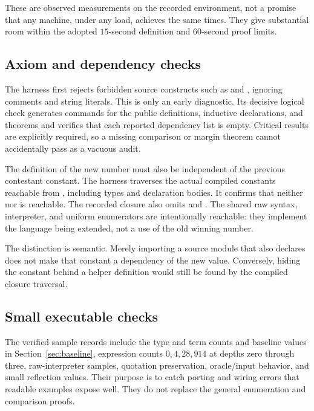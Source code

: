 

These are observed measurements on the recorded environment,
not a promise that any machine, under any load, achieves the same
times. They give substantial room within the adopted \(15\)-second
definition and \(60\)-second proof limits.

\subsection{Axiom and dependency checks}
The harness first rejects forbidden source constructs such as
 and , ignoring comments and string
literals. This is only an early diagnostic. Its decisive logical
check generates  commands for the public
definitions, inductive declarations, and theorems and verifies that
each reported dependency list is empty. Critical results are
explicitly required, so a missing comparison or margin theorem
cannot accidentally pass as a vacuous audit.

The definition of the new number must also be independent of
the previous contestant constant. The harness traverses the
actual compiled constants reachable from
, including types and declaration
bodies. It confirms that neither 
nor  is reachable. The recorded closure
also omits  and .
The shared raw syntax, interpreter, and uniform enumerators
are intentionally reachable: they implement the language being
extended, not a use of the old winning number.

The distinction is semantic. Merely importing a source module
that also declares  does not make that
constant a dependency of the new value. Conversely, hiding
the constant behind a helper definition would still be found
by the compiled closure traversal.

\subsection{Small executable checks}
The verified sample records include the type and term counts
and baseline values in Section~\ref{sec:baseline}, expression
counts \(0,4,28,914\) at depths zero through three, raw-interpreter
samples, quotation preservation, oracle/input behavior, and
small reflection values. Their purpose is to catch porting and
wiring errors that readable examples expose well. They do not
replace the general enumeration and comparison proofs.

